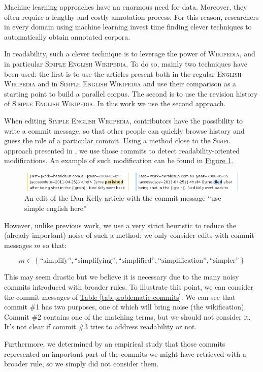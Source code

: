 \documentclass[a4paper, 11pt]{scrreprt}
\newcommand\wiki{\textsc{Wikipedia}}
\newcommand\ew{\textsc{English Wikipedia}}
\newcommand\sew{\textsc{Simple English Wikipedia}}
\newcommand\tableref[1]{\hyperref[#1]{Table \ref*{#1}}}
\newcommand\figureref[1]{\hyperref[#1]{Figure \ref*{#1}}}
\begin{document}
Machine learning approaches have an enormous need for data. Moreover,
they often require a lengthy and costly annotation process. For this
reason, researchers in every domain using machine learning invest time
finding clever techniques to automatically obtain annotated corpora.

In readability, such a clever technique is to leverage the power of
\wiki, and in particular \sew. To do so, mainly two techniques have
been used: the first is to use the articles present both in the
regular \ew{} and in \sew{} and use their comparison as a starting
point to build a parallel corpus. The second is to use the revision
history of \sew. In this work we use the second approach.

When editing \sew, contributors have the possibility to write a commit
message, so that other people can quickly browse history and guess the
role of a particular commit. Using a method close to the
\textsc{Simpl} approach presented in \cite{yatskar2010sake}, we use
those commits to detect readability-oriented modifications. An example
of such modification can be found in \figureref{fig:dan-kelly}.

\begin{figure}[H]
  \centering
  \includegraphics[width=\textwidth]{dan-kelly}
  \caption{An edit of the Dan Kelly article with the commit message
    “use simple english here”}
  \label{fig:dan-kelly}
\end{figure}

However, unlike previous work, we use a very strict heuristic to
reduce the (already important) noise of such a method: we only
consider edits with commit messages $m$ so that:

\[
m \in \left\{\text{“simplify”}, \text{“simplifying”},
  \text{“simplified”}, \text{“simplification”},
  \text{“simpler”}\right\}
\]

This may seem drastic but we believe it is necessary due to the many
noisy commits introduced with broader rules. To illustrate this point,
we can consider the commit messages of
\tableref{tab:problematic-commits}. We can see that commit \#1 has two
purposes, one of which will bring noise (the wikification). Commit \#2
contains one of the matching terms, but we should not consider
it. It's not clear if commit \#3 tries to address readability or not.

Furthermore, we determined by an empirical study that those commits
represented an important part of the commits we might have retrieved
with a broader rule, so we simply did not consider them.
\end{document}

